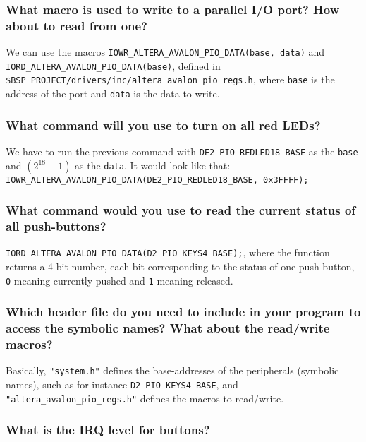 \documentclass[a4paper,10pt]{article}
\begin{document}
\setcounter{subsection}{3}
\setcounter{subsubsection}{0}


\subsubsection{What macro is used to write to a parallel I/O port? How about to read from one?}

We can use the macros \texttt{IOWR\_ALTERA\_AVALON\_PIO\_DATA(base, data)} and  \texttt{IORD\_ALTERA\_AVALON\_PIO\_DATA(base)}, defined in \texttt{\$BSP\_PROJECT/drivers/inc/altera\_avalon\_pio\_regs.h}, where \texttt{base} is the address of the port and \texttt{data} is the data to write.

\subsubsection{What command will you use to turn on all red LEDs?}

We have to run the previous command with \texttt{DE2\_PIO\_REDLED18\_BASE} as the \texttt{base} and $(2^{18}-1)$ as the \texttt{data}.
It would look like that: \texttt{IOWR\_ALTERA\_AVALON\_PIO\_DATA(DE2\_PIO\_REDLED18\_BASE, 0x3FFFF);}

\subsubsection{What command would you use to read the current status of all push-buttons?}

\texttt{IORD\_ALTERA\_AVALON\_PIO\_DATA(D2\_PIO\_KEYS4\_BASE);}, where the function returns a 4 bit number, each bit corresponding to the status of one push-button, \texttt{0} meaning currently pushed and \texttt{1} meaning released. 

\subsubsection{Which header file do you need to include in your program to access the symbolic names? What about the read/write macros?}

Basically, \texttt{"system.h"} defines the base-addresses of the peripherals (symbolic names), such as for instance \texttt{D2\_PIO\_KEYS4\_BASE}, and \texttt{"altera\_avalon\_pio\_regs.h"} defines the macros to read/write.

\setcounter{subsection}{6}
\setcounter{subsubsection}{0}
\subsubsection{What is the IRQ level for buttons?}
\end{document}
